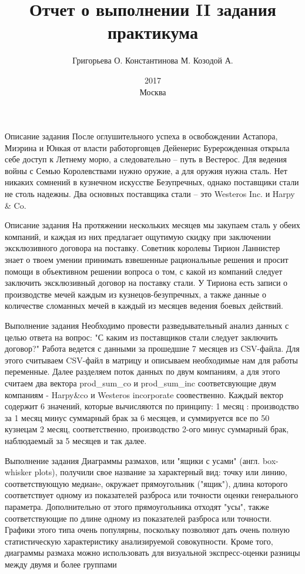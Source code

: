 \documentclass{beamer}
\begin{document}
\title{Отчет о выполнении II задания практикума}  
\author{Григорьева О. Константинова М. Козодой А.}
\date{ 2017\\Москва} 
\thispagestyle{empty}
\frame{\titlepage} 

\begin{frame}{Описание задания}
	После оглушительного успеха в освобождении Астапора, Миэрина и Юнкая от власти работорговцев Дейенерис Бурерожденная открыла себе доступ к Летнему морю, а следовательно -- путь в Вестерос.
	Для ведения войны с Семью Королевствами нужно оружие, а для оружия нужна сталь. Нет никаких сомнений в кузнечном искусстве Безупречных, однако поставщики стали не столь надежны.
	Два основных поставщика стали -- это Westeros Inc. и Harpy & Co. 
\end{frame}

\begin{frame}{Описание задания}
	На протяжении нескольких месяцев мы закупаем сталь у обеих компаний, и каждая из них предлагает ощутимую скидку при заключении эксклюзивного договора на поставку.
	Советник королевы Тирион Ланнистер знает о твоем умении принимать взвешенные рациональные решения и просит помощи в объективном решении вопроса о том, с какой из компаний следует заключить эксклюзивный договор на поставку стали.
	У Тириона есть записи о производстве мечей каждым из кузнецов-безупречных, а также данные о количестве сломанных мечей в каждый из месяцев ведения боевых действий.
\end{frame}


\begin{frame}{Выполнение задания}
Необходимо провести разведывательный анализ данных с целью ответа на вопрос: "С каким из поставщиков стали следует заключить договор?" Работа ведется с  данными за прошедшие 7 месяцев из CSV-файла.	
Для этого считываем CSV-файл в матрицу и описываем необходимые нам для работы переменные.
Далее разделяем поток данных по двум компаниям, а для этого считаем два вектора prod{\_}sum{\_}co и prod{\_}sum{\_}inc соответсвующие двум компаниям - Harpy&co и Westeros incorporate соовественно.
Каждый вектор содержит 6 значений, которые вычисляются по принципу:
1 месяц : производство за 1 месяц минус суммарный брак за 6 месяцев, и суммируется все по 50 кузнецам
2 месяц, соответственно, производство 2-ого минус суммарный брак, наблюдаемый за 5 месяцев и так далее.
\end{frame}

\begin{frame}{Выполнение задания}
Диаграммы размахов, или "ящики с усами" (англ. box-whisker plots), получили свое название за характерный вид: точку или линию, соответствующую медианe, окружает прямоугольник ("ящик"), длина которого соответствует одному из показателей разброса или точности оценки генерального параметра. Дополнительно от этого прямоугольника отходят "усы", также соответствующие по длине одному из показателей разброса или точности. Графики этого типа очень популярны, поскольку позволяют дать очень полную статистическую характеристику анализируемой совокупности. Кроме того, диаграммы размаха можно использовать для визуальной экспресс-оценки разницы между двумя и более группами
\end{frame}
\end{document}
